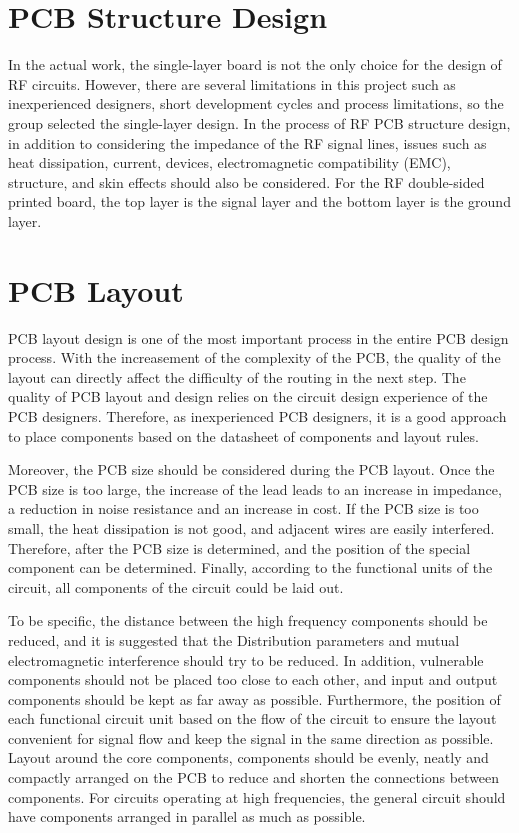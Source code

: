 \documentclass[12pt, a4paper]{report}
\begin{document}
\section{PCB Structure Design}

In the actual work, the single-layer board is not the only choice for the design of RF circuits. However, there are several limitations in this project such as inexperienced designers, short development cycles and process limitations, so the group selected the single-layer design. In the process of RF PCB structure design, in addition to considering the impedance of the RF signal lines, issues such as heat dissipation, current, devices, electromagnetic compatibility (EMC), structure, and skin effects should also be considered. For the RF double-sided printed board, the top layer is the signal layer and the bottom layer is the ground layer.


\section{PCB Layout}
PCB layout design is one of the most important process in the entire PCB design process. With the increasement of the complexity of the PCB, the quality of the layout can directly affect the difficulty of the routing in the next step. The quality of PCB layout and design relies on the circuit design experience of the PCB designers. Therefore, as inexperienced PCB designers, it is a good approach to place components based on the datasheet of components and layout rules.

Moreover, the PCB size should be considered during the PCB layout. Once the PCB size is too large, the increase of the lead leads to an increase in impedance, a reduction in noise resistance and an increase in cost. If the PCB size is too small, the heat dissipation is not good, and adjacent wires are easily interfered. Therefore, after the PCB size is determined, and the position of the special component can be determined. Finally, according to the functional units of the circuit, all components of the circuit could be laid out.

To be specific, the distance between the high frequency components should be reduced, and it is suggested that the Distribution parameters and mutual electromagnetic interference should try to be reduced. In addition, vulnerable components should not be placed too close to each other, and input and output components should be kept as far away as possible. Furthermore, the position of each functional circuit unit based on the flow of the circuit to ensure the layout convenient for signal flow and keep the signal in the same direction as possible. Layout around the core components, components should be evenly, neatly and compactly arranged on the PCB to reduce and shorten the connections between components. For circuits operating at high frequencies, the general circuit should have components arranged in parallel as much as possible.
\end{document}
